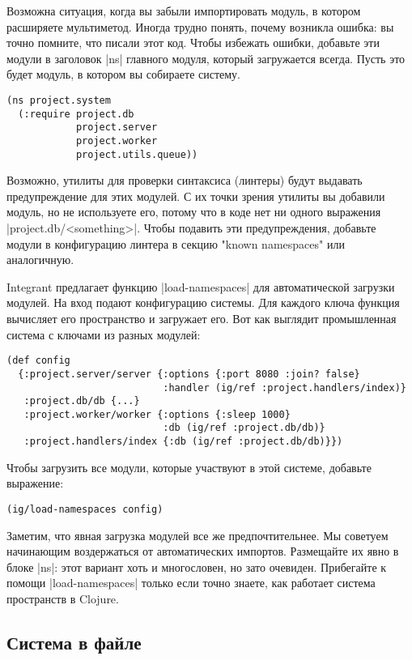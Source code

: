 Возможна ситуация, когда вы забыли импортировать модуль, в котором расширяете
мультиметод. Иногда трудно понять, почему возникла ошибка: вы точно помните, что
писали этот код. Чтобы избежать ошибки, добавьте эти модули в заголовок \spverb|ns|
главного модуля, который загружается всегда. Пусть это будет модуль, в котором
вы собираете систему.

\begin{verbatim}
(ns project.system
  (:require project.db
            project.server
            project.worker
            project.utils.queue))
\end{verbatim}

Возможно, утилиты для проверки синтаксиса (линтеры) будут выдавать
предупреждение для этих модулей. С их точки зрения утилиты вы добавили модуль,
но не используете его, потому что в коде нет ни одного выражения
\spverb|project.db/<something>|. Чтобы подавить эти предупреждения, добавьте модули в
конфигурацию линтера в секцию "known namespaces" или аналогичную.

Integrant предлагает функцию \spverb|load-namespaces| для автоматической загрузки
модулей. На вход подают конфигурацию системы. Для каждого ключа функция
вычисляет его пространство и загружает его. Вот как выглядит промышленная
система с ключами из разных модулей:

\begin{verbatim}
(def config
  {:project.server/server {:options {:port 8080 :join? false}
                           :handler (ig/ref :project.handlers/index)}
   :project.db/db {...}
   :project.worker/worker {:options {:sleep 1000}
                           :db (ig/ref :project.db/db)}
   :project.handlers/index {:db (ig/ref :project.db/db)}})
\end{verbatim}

Чтобы загрузить все модули, которые участвуют в этой системе, добавьте
выражение:

\begin{verbatim}
(ig/load-namespaces config)
\end{verbatim}

Заметим, что явная загрузка модулей все же предпочтительнее. Мы советуем
начинающим воздержаться от автоматических импортов. Размещайте их явно в блоке
\spverb|ns|: этот вариант хоть и многословен, но зато очевиден. Прибегайте к помощи
\spverb|load-namespaces| только если точно знаете, как работает система пространств в
Clojure.

\subsection{Система в файле}

